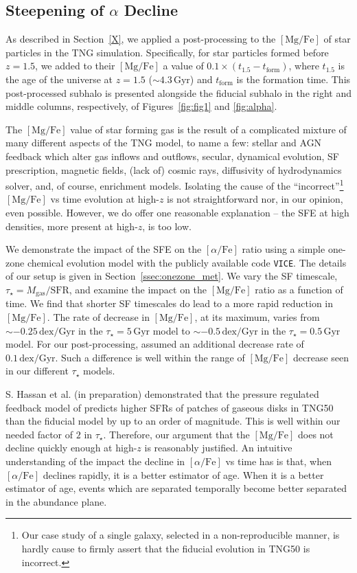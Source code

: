 \documentclass[linenumbers, twocolumn]{aastex631}
\newcommand{\Gyr}{\ensuremath{\textrm{Gyr}}}
\newcommand{\MgFe}{\ensuremath{[\textrm{Mg}/\textrm{Fe}]}}
\newcommand{\alphaFe}{\ensuremath{[\alpha/\textrm{Fe}]}}
\newcommand{\dex}{\ensuremath{\textrm{dex}}}
\begin{document}
\subsection{Steepening of $\alpha$ Decline}\label{ssec:sfe}
As described in Section~\ref{X}, we applied a post-processing to the \MgFe{} of star particles in the TNG simulation. Specifically, for star particles formed before $z=1.5$, we added to their \MgFe{} a value of $0.1\times\left(t_{1.5}-t_{\textrm{form}}\right)$, where $t_{1.5}$ is the age of the universe at $z=1.5$ ($\sim4.3\,\Gyr$) and $t_{\textrm{form}}$ is the formation time. This post-processed subhalo is presented alongside the fiducial subhalo in the right and middle columns, respectively, of Figures~\ref{fig:fig1} and \ref{fig:alpha}.

The \MgFe{} value of star forming gas is the result of a complicated mixture of many different aspects of the TNG model, to name a few: stellar and AGN feedback which alter gas inflows and outflows, secular, dynamical evolution, SF prescription, magnetic fields, (lack of) cosmic rays, diffusivity of hydrodynamics solver, and, of course, enrichment models. Isolating the cause of the ``incorrect''\footnote{Our case study of a single galaxy, selected in a non-reproducible manner, is hardly cause to firmly assert that the fiducial evolution in TNG50 is incorrect.} \MgFe{} vs time evolution at high-$z$ is not straightforward nor, in our opinion, even possible. However, we do offer one reasonable explanation -- the SFE at high densities, more present at high-$z$, is too low.

We demonstrate the impact of the SFE on the \alphaFe{} ratio using a simple one-zone chemical evolution model with the publicly available code \texttt{VICE}. The details of our setup is given in Section~\ref{ssec:onezone_met}. We vary the SF timescale, $\tau_{\star}=M_{\textrm{gas}}/\textrm{SFR}$, and examine the impact on the \MgFe{} ratio as a function of time. We find that shorter SF timescales do lead to a more rapid reduction in \MgFe{}. The rate of decrease in \MgFe{}, at its maximum, varies from $\sim-0.25\,\dex/\Gyr$ in the $\tau_{\star}=5\,\Gyr$ model to $\sim-0.5\,\dex/\Gyr$ in the $\tau_{\star}=0.5\,\Gyr$ model. For our post-processing, assumed an additional decrease rate of $0.1\,\dex/\Gyr$. Such a difference is well within the range of \MgFe{} decrease seen in our different $\tau_{\star}$ models.

S. Hassan et al. (in preparation) demonstrated that the pressure regulated feedback model of \citet{2022ApJ...936..137O} predicts higher SFRs of patches of gaseous disks in TNG50 than the fiducial model by up to an order of magnitude. This is well within our needed factor of $2$ in $\tau_{\star}$. Therefore, our argument that the \MgFe{} does not decline quickly enough at high-$z$ is reasonably justified. An intuitive understanding of the impact the decline in \alphaFe{} vs time has is that, when \alphaFe{} declines rapidly, it is a better estimator of age. When it is a better estimator of age, events which are separated temporally become better separated in the abundance plane.
\end{document}
